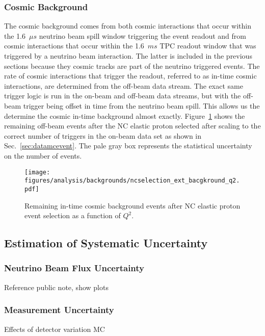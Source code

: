   \subsubsection{Cosmic Background}
    The cosmic background comes from both cosmic interactions that occur within
    the 1.6~$\mu s$ neutrino beam spill window triggering the event readout and
    from cosmic interactions that occur within the 1.6~$ms$ TPC readout window
    that was triggered by a neutrino beam interaction. The latter is included
    in the previous sections because they cosmic tracks are part of the
    neutrino triggered events. The rate of cosmic interactions that trigger the
    readout, referred to as in-time cosmic interactions, are determined from
    the off-beam data stream. The exact same trigger logic is run in the
    on-beam and off-beam data streams, but with the off-beam trigger being
    offset in time from the neutrino beam spill. This allows us the determine
    the cosmic in-time background almost exactly.  Figure~\ref{fig:selectedext}
    shows the remaining off-beam events after the NC elastic proton selected
    after scaling to the correct number of triggers in the on-beam data set as
    shown in Sec.~\ref{sec:datamcevent}. The pale gray box represents the
    statistical uncertainty on the number of events.
    \begin{figure}[ht]
      \centering
      \texttt{[image: figures/analysis/backgrounds/ncselection\_ext\_bacgkround\_q2.pdf]}
      \caption{Remaining in-time cosmic background events after NC elastic
      proton event selection as a function of $Q^2$.}
      \label{fig:selectedext}
    \end{figure}
  

\subsection{Estimation of Systematic Uncertainty}\label{sec:systematics}
  \subsubsection{Neutrino Beam Flux Uncertainty}\label{sec:fluxuncertainty}
    Reference public note, show plots
  \subsubsection{Measurement Uncertainty}\label{sec:detvar}
    Effects of detector variation MC
